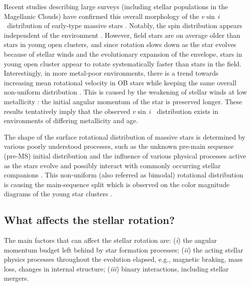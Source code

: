 \documentclass{aa}
\newcommand{\vsini} {$v\sin\,i$}
\begin{document}
Recent studies describing large surveys (including stellar
populations in the Magellanic Clouds) have confirmed this overall
morphology of the \vsini~distribution of early-type massive stars
\citep[e.g.,][]{Dufton_2013,vfts_2013_otype,Holgado_2022}. Notably,
the spin distribution appears independent of the environment
\citep[e.g., Galactic field vs. young stellar
clusters,][]{Wolff_2007,Penny_2009, Huang_2010}. However, field stars
are on average older than stars in young open clusters, and since
rotation slows down as the star evolves because of stellar winds and the evolutionary expansion of the envelope, stars in young open cluster appear to rotate
systematically faster than stars in the field.
Interestingly, in more metal-poor environments, there is a trend
towards increasing mean rotational velocity in OB stars while keeping
the same overall non-uniform distribution \citep{Ramachandran_2019}. This is caused by the
  weakening of stellar winds at low metallicity
\citep[e.g.,][]{Vink_2001,mokiem:07}: the initial angular momentum of
the star is preserved longer. These results tentatively imply that the
observed \vsini~ distribution exists in environments of differing metallicity
and age.



The shape of the surface rotational distribution of massive
  stars is determined by various poorly understood processes, such as the unknown pre-main sequence (pre-MS)
  initial distribution and the influence of various physical processes
  active as the stars evolve and possibly interact with commonly
  occurring \citep[e.g.,][]{Sana_2012, moe_2017, Offner_2022} stellar
  companions \citep[e.g.,][]{packet:81, deMink_2013, vfts_2015_otype}.
This non-uniform (also referred as bimodal) rotational distribution is causing the main-sequence split which is observed on the color magnitude diagrams of the young star clusters \citep[see, e.g.][]{Kamann_2023,Wang_2023}.


\subsection{What affects the stellar rotation?}

The main factors that can affect the stellar rotation are: (\emph{i}) the
angular momentum budget left behind by star formation processes;
(\emph{ii}) the acting stellar physics processes throughout the
  evolution elapsed, e.g., magnetic braking, mass loss, changes in internal structure;
(\emph{iii}) binary interactions, including stellar mergers.
\end{document}
